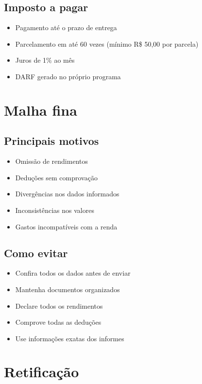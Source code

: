 \documentclass[12pt,a4paper]{article}
\begin{document}
\subsection{Imposto a pagar}
\begin{itemize}
    \item Pagamento até o prazo de entrega
    \item Parcelamento em até 60 vezes (mínimo R\$ 50,00 por parcela)
    \item Juros de 1\% ao mês
    \item DARF gerado no próprio programa
\end{itemize}

\section{Malha fina}

\subsection{Principais motivos}
\begin{itemize}
    \item Omissão de rendimentos
    \item Deduções sem comprovação
    \item Divergências nos dados informados
    \item Inconsistências nos valores
    \item Gastos incompatíveis com a renda
\end{itemize}

\subsection{Como evitar}
\begin{itemize}
    \item Confira todos os dados antes de enviar
    \item Mantenha documentos organizados
    \item Declare todos os rendimentos
    \item Comprove todas as deduções
    \item Use informações exatas dos informes
\end{itemize}

\section{Retificação}
\end{document}
